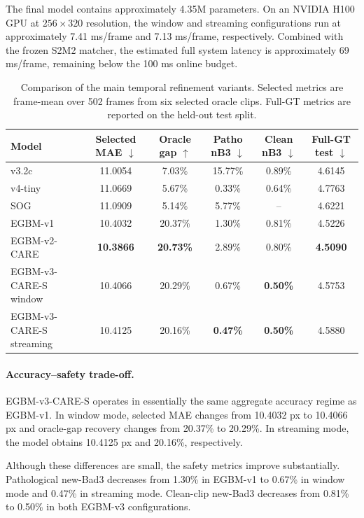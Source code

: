 \documentclass[11pt,a4paper]{article}
\begin{document}
The final model contains approximately 4.35M parameters. On an NVIDIA H100 GPU
at $256\times320$ resolution, the window and streaming configurations run at
approximately 7.41 ms/frame and 7.13 ms/frame, respectively. Combined with the
frozen S2M2 matcher, the estimated full system latency is approximately
69 ms/frame, remaining below the 100 ms online budget.

\begin{table}[t]
\centering
\caption{Comparison of the main temporal refinement variants. Selected metrics
are frame-mean over 502 frames from six selected oracle clips. Full-GT metrics
are reported on the held-out test split.}
\label{tab:egbm_v3_comparison}
\begin{tabular}{lccccc}
\toprule
Model &
Selected MAE $\downarrow$ &
Oracle gap $\uparrow$ &
Patho nB3 $\downarrow$ &
Clean nB3 $\downarrow$ &
Full-GT test $\downarrow$ \\
\midrule
v3.2c &
11.0054 &
7.03\% &
15.77\% &
0.89\% &
4.6145 \\
v4-tiny &
11.0669 &
5.67\% &
0.33\% &
0.64\% &
4.7763 \\
SOG &
11.0909 &
5.14\% &
5.77\% &
-- &
4.6221 \\
EGBM-v1 &
10.4032 &
20.37\% &
1.30\% &
0.81\% &
4.5226 \\
EGBM-v2-CARE &
\textbf{10.3866} &
\textbf{20.73\%} &
2.89\% &
0.80\% &
\textbf{4.5090} \\
EGBM-v3-CARE-S window &
10.4066 &
20.29\% &
0.67\% &
\textbf{0.50\%} &
4.5753 \\
EGBM-v3-CARE-S streaming &
10.4125 &
20.16\% &
\textbf{0.47\%} &
\textbf{0.50\%} &
4.5880 \\
\bottomrule
\end{tabular}
\end{table}

\paragraph{Accuracy--safety trade-off.}
EGBM-v3-CARE-S operates in essentially the same aggregate accuracy regime as
EGBM-v1. In window mode, selected MAE changes from 10.4032 px to 10.4066 px and
oracle-gap recovery changes from 20.37\% to 20.29\%. In streaming mode, the model
obtains 10.4125 px and 20.16\%, respectively.

Although these differences are small, the safety metrics improve substantially.
Pathological new-Bad3 decreases from 1.30\% in EGBM-v1 to 0.67\% in window mode
and 0.47\% in streaming mode. Clean-clip new-Bad3 decreases from 0.81\% to
0.50\% in both EGBM-v3 configurations.
\end{document}
